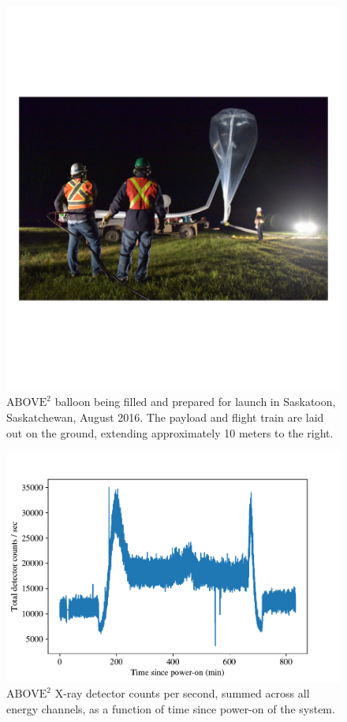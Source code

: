 \begin{figure}[p]
    \centering
    \includegraphics[width=1.0\textwidth]{figures/chapter_5/abv2_launch/abv2_launch}
    \caption{$\text{ABOVE}^2$ balloon being filled and prepared for launch in Saskatoon, Saskatchewan, August 2016. The payload and flight train are laid out on the ground, extending approximately 10 meters to the right.}
    \label{abv2_launch}
\end{figure}

\begin{figure}[p]
    \centering
    \includegraphics[width=1.0\textwidth]{figures/chapter_5/abv2_counts/abv2_counts2.pdf}
    \caption{$\text{ABOVE}^2$ X-ray detector counts per second, summed across all energy channels, as a function of time since power-on of the system.}
    \label{abv2_counts}
\end{figure}

